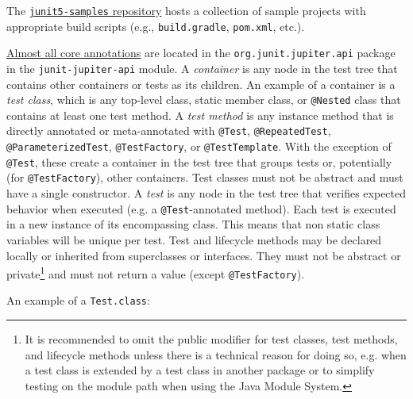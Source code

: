 \documentclass[table, xcdraw]{article}%
\begin{document}
The \href{https://github.com/junit-team/junit5-samples}{\texttt{junit5-samples} repository} hosts a collection of sample projects with appropriate build scripts (e.g., \texttt{build.gradle}, \texttt{pom.xml}, etc.).

\href{https://junit.org/junit5/docs/current/user-guide/#writing-tests-annotations}{Almost all core annotations} are located in the \texttt{org.junit.jupiter.api} package in the \texttt{junit-jupiter-api} module. A \emph{container} is any node in the test tree that contains other containers or tests as its children. An example of a container is a \emph{test class}, which is any top-level class, static member class, or \texttt{@Nested} class that contains at least one test method. A \emph{test method} is any instance method that is directly annotated or meta-annotated with \texttt{@Test}, \texttt{@RepeatedTest}, \texttt{@ParameterizedTest}, \texttt{@TestFactory}, or \texttt{@TestTemplate}. With the exception of \texttt{@Test}, these create a container in the test tree that groups tests or, potentially (for \texttt{@TestFactory}), other containers. Test classes must not be abstract and must have a single constructor. A \emph{test} is any node in the test tree that verifies expected behavior when executed (e.g. a \texttt{@Test}-annotated method). Each test is executed in a new instance of its encompassing class. This means that non static class variables will be unique per test. Test and lifecycle methods may be declared locally or inherited from superclasses or interfaces. They must not be abstract or private\footnote{It is recommended to omit the public modifier for test classes, test methods, and lifecycle methods unless there is a technical reason for doing so, e.g. when a test class is extended by a test class in another package or to simplify testing on the module path when using the Java Module System.} and must not return a value (except \texttt{@TestFactory}).

An example of a \texttt{Test.class}:
\end{document}
